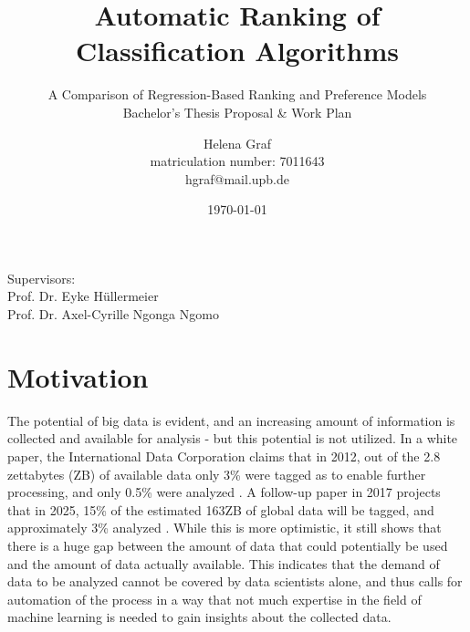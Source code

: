 \documentclass[12pt]{scrartcl}
\begin{document}
\title{Automatic Ranking of Classification Algorithms}
\subtitle{A Comparison of Regression-Based Ranking and Preference Models
\\\vspace{2em}Bachelor's Thesis Proposal \& Work Plan}

\author{Helena Graf\\ 
\small{matriculation number: 7011643}\\ 
\small{hgraf@mail.upb.de}}
\date{\today}

\maketitle
\vspace{2em}

\begin{center}
\small{Supervisors:}\\
\large{Prof. Dr. Eyke H\"ullermeier}\\
\large{Prof. Dr. Axel-Cyrille Ngonga Ngomo}
\end{center}

\newpage


\section{Motivation}\label{sec:motivation}
The potential of big data is evident, and an increasing amount of information is collected and available for analysis - but this potential is not utilized. In a white paper, the International Data Corporation claims that in 2012, out of the 2.8 zettabytes (ZB) of available data only 3\% were tagged as to enable further processing, and only 0.5\% were analyzed \cite{gantz2012the}. A follow-up paper in 2017 projects that in 2025, 15\% of the estimated 163ZB of global data will be tagged, and approximately 3\% analyzed \cite{gantz2017data}. While this is more optimistic, it still shows that there is a huge gap between the amount of data that could potentially be used and the amount of data actually available. This indicates that the demand of data to be analyzed cannot be covered by data scientists alone, and thus calls for automation of the process in a way that not much expertise in the field of machine learning is needed to gain insights about the collected data.\\
\end{document}
